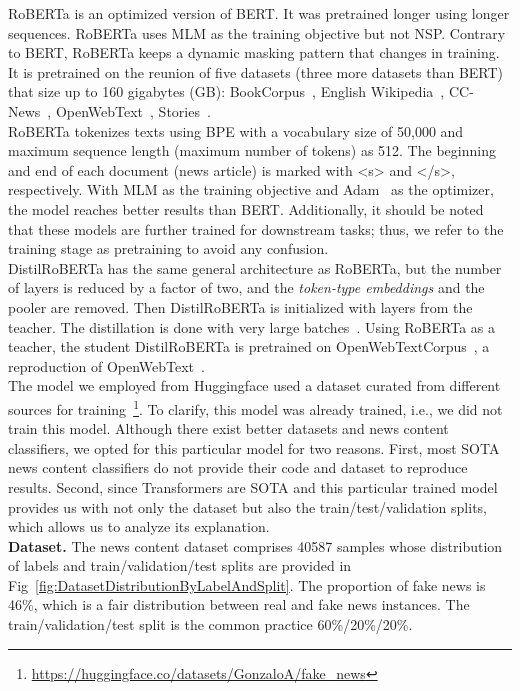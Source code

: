 RoBERTa is an optimized version of BERT. It was pretrained longer using longer sequences. RoBERTa uses MLM as the training objective but not NSP. Contrary to BERT, RoBERTa keeps a dynamic masking pattern that changes in training. It is
pretrained on the reunion of five datasets (three more datasets than BERT) that size up to 160 gigabytes (GB): BookCorpus~\parencite{BookCorpus_Yukun},
English Wikipedia~\parencite{EnglishWikipedia_Wiki},
CC-News~\parencite{CCNews_Nagel}, OpenWebText~\parencite{OpenWebText_Radford},
Stories~\parencite{ASimpleMethodForCommonsenseReasoning_Trinh}.\\
RoBERTa tokenizes texts using BPE with a vocabulary size of 50,000 and maximum sequence length (maximum number of tokens) as 512. The beginning and end of each document (news article) is marked with <s> and </s>, respectively. With MLM as the training objective and Adam~\parencite*{Adam_Kingma} as the optimizer, the model reaches better results than BERT. Additionally, it should be noted that these models are further trained for downstream tasks; thus, we refer to the training stage as pretraining to avoid any confusion.\\
DistilRoBERTa has the same general architecture as RoBERTa, but the number of layers is reduced by a factor of two, and the
\emph{token-type embeddings} and the pooler are removed. Then DistilRoBERTa is initialized with layers from the teacher.
The distillation is done with very large batches~\parencite{DistilBERT_Sanh}. Using RoBERTa as a teacher, the student DistilRoBERTa is pretrained on OpenWebTextCorpus~\parencite{OpenWebTextCorpus_Gokaslan}, a reproduction of OpenWebText~\parencite{OpenWebText_Radford}.\\
The model we employed from Huggingface used a dataset curated from different sources for training~\footnote{\url{https://huggingface.co/datasets/GonzaloA/fake_news}}. To clarify, this model was already trained, i.e., we did not train this model. Although there exist better datasets and news content classifiers, we opted for this particular model for two reasons. First, most SOTA news content classifiers do not provide their code and dataset to reproduce results. Second, since Transformers are SOTA and this particular trained model provides us with not only the dataset but also the train/test/validation splits, which allows us to analyze its explanation.\\
\textbf{Dataset.} The news content dataset comprises 40587 samples whose distribution of labels and train/validation/test splits are provided in Fig~\ref{fig:DatasetDistributionByLabelAndSplit}. The proportion of fake news is 46\%, which is a fair distribution between real and fake news instances. The train/validation/test split is the common practice 60\%/20\%/20\%.
